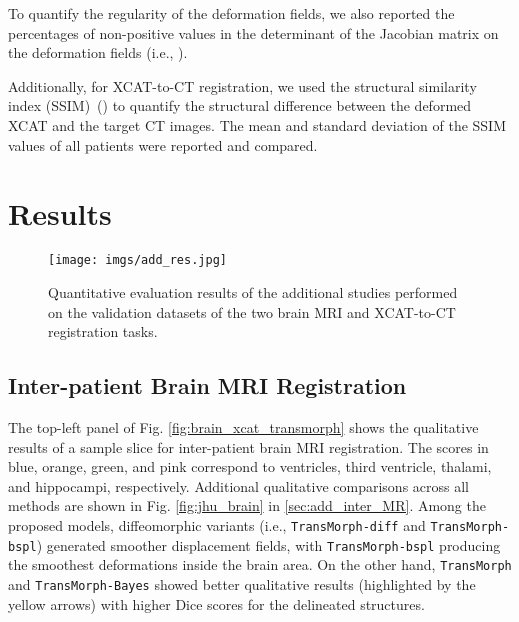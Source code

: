 \documentclass[times,twocolumn,final]{elsarticle}
\begin{document}
To quantify the regularity of the deformation fields, we also reported the percentages of non-positive values in the determinant of the Jacobian matrix on the deformation fields (i.e., ).

Additionally, for XCAT-to-CT registration, we used the structural similarity index (SSIM)~(\cite{wang2004image}) to quantify the structural difference between the deformed XCAT and the target CT images. The mean and standard deviation of the SSIM values of all patients were reported and compared.
\section{Results}
\label{sec:results}

\begin{figure*}[!t]
\centering
\texttt{[image: imgs/add\_res.jpg]}
\caption{Quantitative evaluation results of the additional studies performed on the validation datasets of the two brain MRI and XCAT-to-CT registration tasks.\label{fig:ablation_res}}
\end{figure*}

\subsection{Inter-patient Brain MRI Registration}
The top-left panel of Fig. \ref{fig:brain_xcat_transmorph} shows the qualitative results of a sample slice for inter-patient brain MRI registration. The scores in blue, orange, green, and pink correspond to ventricles, third ventricle, thalami, and hippocampi, respectively. Additional qualitative comparisons across all methods are shown in Fig. \ref{fig:jhu_brain} in \ref{sec:add_inter_MR}. Among the proposed models, diffeomorphic variants (i.e., \texttt{TransMorph-diff} and \texttt{TransMorph-bspl}) generated smoother displacement fields, with \texttt{TransMorph-bspl} producing the smoothest deformations inside the brain area. On the other hand, \texttt{TransMorph} and \texttt{TransMorph-Bayes} showed better qualitative results (highlighted by the yellow arrows) with higher Dice scores for the delineated structures. 
\end{document}
